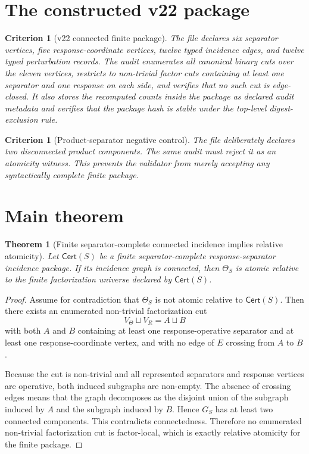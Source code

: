 \documentclass[11pt]{article}
\newtheorem{theorem}[definition]{Theorem}
\newtheorem{criterion}[definition]{Criterion}
\newcommand{\VTheta}{V_{\Theta}}
\newcommand{\VR}{V_R}
\newcommand{\Cert}{\mathsf{Cert}}
\begin{document}
\section{The constructed v22 package}

\begin{criterion}[v22 connected finite package]
The file  declares six separator vertices, five response-coordinate vertices, twelve typed incidence edges, and twelve typed perturbation records. The audit enumerates all canonical binary cuts over the eleven vertices, restricts to non-trivial factor cuts containing at least one separator and one response on each side, and verifies that no such cut is edge-closed. It also stores the recomputed counts inside the package as declared audit metadata and verifies that the package hash is stable under the top-level digest-exclusion rule.
\end{criterion}

\begin{criterion}[Product-separator negative control]
The file  deliberately declares two disconnected product components. The same audit must reject it as an atomicity witness. This prevents the validator from merely accepting any syntactically complete finite package.
\end{criterion}

\section{Main theorem}

\begin{theorem}[Finite separator-complete connected incidence implies relative atomicity]
Let $\Cert(S)$ be a finite separator-complete response-separator incidence package. If its incidence graph is connected, then $\Theta_S$ is atomic relative to the finite factorization universe declared by $\Cert(S)$.
\end{theorem}

\begin{proof}
Assume for contradiction that $\Theta_S$ is not atomic relative to $\Cert(S)$. Then there exists an enumerated non-trivial factorization cut
\[
  \VTheta\sqcup\VR = A\sqcup B
\]
with both $A$ and $B$ containing at least one response-operative separator and at least one response-coordinate vertex, and with no edge of $E$ crossing from $A$ to $B$.

Because the cut is non-trivial and all represented separators and response vertices are operative, both induced subgraphs are non-empty. The absence of crossing edges means that the graph decomposes as the disjoint union of the subgraph induced by $A$ and the subgraph induced by $B$. Hence $G_S$ has at least two connected components. This contradicts connectedness. Therefore no enumerated non-trivial factorization cut is factor-local, which is exactly relative atomicity for the finite package.
\end{proof}
\end{document}
